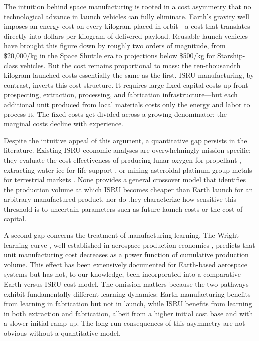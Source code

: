 \documentclass[preprint,12pt]{elsarticle}
\begin{document}
The intuition behind space manufacturing is rooted in a cost asymmetry that no technological advance in launch vehicles can fully eliminate. Earth's gravity well imposes an energy cost on every kilogram placed in orbit---a cost that translates directly into dollars per kilogram of delivered payload. Reusable launch vehicles have brought this figure down by roughly two orders of magnitude, from \$20{,}000/kg in the Space Shuttle era to projections below \$500/kg for Starship-class vehicles. But the cost remains proportional to mass: the ten-thousandth kilogram launched costs essentially the same as the first. ISRU manufacturing, by contrast, inverts this cost structure. It requires large fixed capital costs up front---prospecting, extraction, processing, and fabrication infrastructure---but each additional unit produced from local materials costs only the energy and labor to process it. The fixed costs get divided across a growing denominator; the marginal costs decline with experience.

Despite the intuitive appeal of this argument, a quantitative gap persists in the literature. Existing ISRU economic analyses are overwhelmingly mission-specific: they evaluate the cost-effectiveness of producing lunar oxygen for propellant \cite{sanders2015}, extracting water ice for life support \cite{zubrin1996}, or mining asteroidal platinum-group metals for terrestrial markets \cite{sonter1997,elvis2012}. None provides a general crossover model that identifies the production volume at which ISRU becomes cheaper than Earth launch for an arbitrary manufactured product, nor do they characterize how sensitive this threshold is to uncertain parameters such as future launch costs or the cost of capital.

A second gap concerns the treatment of manufacturing learning. The Wright learning curve \cite{wright1936}, well established in aerospace production economics \cite{wertz2011}, predicts that unit manufacturing cost decreases as a power function of cumulative production volume. This effect has been extensively documented for Earth-based aerospace systems \cite{argote1990,nagy2013} but has not, to our knowledge, been incorporated into a comparative Earth-versus-ISRU cost model. The omission matters because the two pathways exhibit fundamentally different learning dynamics: Earth manufacturing benefits from learning in fabrication but not in launch, while ISRU benefits from learning in both extraction and fabrication, albeit from a higher initial cost base and with a slower initial ramp-up. The long-run consequences of this asymmetry are not obvious without a quantitative model.
\end{document}

